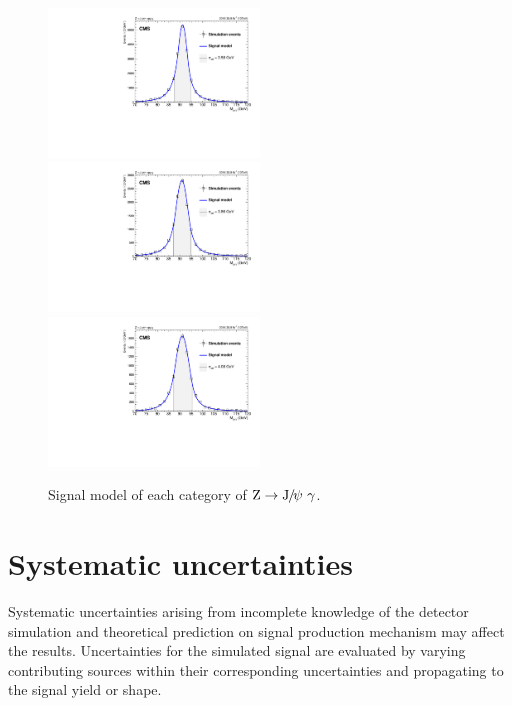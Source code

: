 		\begin{figure}[p]
		    \centering
		    \includegraphics[width=0.5\textwidth]{Fig/Fit/signal/SigFit_ZJpsiG_EBHR9}~
		    \includegraphics[width=0.5\textwidth]{Fig/Fit/signal/SigFit_ZJpsiG_EBLR9}\\
		    \includegraphics[width=0.5\textwidth]{Fig/Fit/signal/SigFit_ZJpsiG_EE}\\
		    \caption[Signal_zjpsig]{\label{fig:signal_zjpsig}
		      Signal model of each category of $\mathrm{Z}\to{\mathrm{J}\hspace{-.08em}/\hspace{-.14em}\psi}\ \gamma$.}
		\end{figure}
		
		\section{Systematic uncertainties}
		\label{sec:Systematic}
		Systematic uncertainties arising from incomplete knowledge of the detector simulation and theoretical prediction on signal production mechanism may affect the results. 
		Uncertainties for the simulated signal are evaluated by varying contributing sources within their corresponding uncertainties and propagating to the signal yield or shape.  
		
